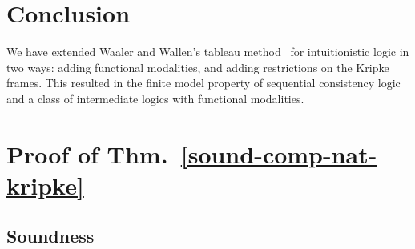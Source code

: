 \documentclass[doctor]{iscs-thesis}
\begin{document}
\section{Conclusion}

We have extended Waaler and Wallen's tableau method~\cite{waaler1999tableaux} for intuitionistic
logic in two ways: adding functional modalities, and adding restrictions on the Kripke frames.
This resulted in the finite model property of sequential consistency
logic~\cite{lpar-hirai} and a class of intermediate logics with
functional modalities.




\appendix
\section{Proof of Thm.~\ref{sound-comp-nat-kripke}}
\label{app}
\subsection{Soundness}
\end{document}
